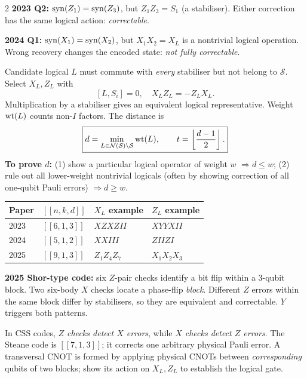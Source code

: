 \begin{multicols}{2}
\columnbreak
{}
\textbf{2023 Q2:} $\operatorname{syn}(Z_1)=\operatorname{syn}(Z_3)$, but $Z_1Z_3=S_1$ (a stabiliser). Either correction has the same logical action: \emph{correctable}.

\textbf{2024 Q1:} $\operatorname{syn}(X_1)=\operatorname{syn}(X_2)$, but $X_1X_2=X_L$ is a nontrivial logical operation. Wrong recovery changes the encoded state: \emph{not fully correctable}.

Candidate logical $L$ must commute with \emph{every} stabiliser but not belong to $\mathcal S$. Select $X_L,Z_L$ with
\[[L,S_i]=0,\quad X_LZ_L=-Z_LX_L.\]
Multiplication by a stabiliser gives an equivalent logical representative. Weight $\operatorname{wt}(L)$ counts non-$I$ factors. The distance is
\[\boxed{d=\min_{L\in\mathcal N(\mathcal S)\setminus\mathcal S}\operatorname{wt}(L),\qquad t=\left\lfloor\frac{d-1}{2}\right\rfloor.}\]
\textbf{To prove $d$:} (1) show a particular logical operator of weight $w$ $\Rightarrow d\le w$; (2) rule out all lower-weight nontrivial logicals (often by showing correction of all one-qubit Pauli errors) $\Rightarrow d\ge w$.

\begin{center}\footnotesize
\begin{tabular}{@{}llll@{}}\toprule
Paper&$[[n,k,d]]$&$X_L$ example&$Z_L$ example\\\midrule
2023&$[[6,1,3]]$&$XZXZII$&$XYYXII$\\
2024&$[[5,1,2]]$&$XXIII$&$ZIIZI$\\
2025&$[[9,1,3]]$&$Z_1Z_4Z_7$&$X_1X_2X_3$\\
\bottomrule\end{tabular}
\end{center}
\textbf{2025 Shor-type code:} six $Z$-pair checks identify a bit flip within a 3-qubit block. Two six-body $X$ checks locate a phase-flip \emph{block}. Different $Z$ errors within the same block differ by stabilisers, so they are equivalent and correctable. $Y$ triggers both patterns.

In CSS codes, \emph{$Z$ checks detect $X$ errors}, while \emph{$X$ checks detect $Z$ errors}. The Steane code is $[[7,1,3]]$; it corrects one arbitrary physical Pauli error. A transversal CNOT is formed by applying physical CNOTs between \emph{corresponding} qubits of two blocks; show its action on $X_L,Z_L$ to establish the logical gate.
\end{multicols}
